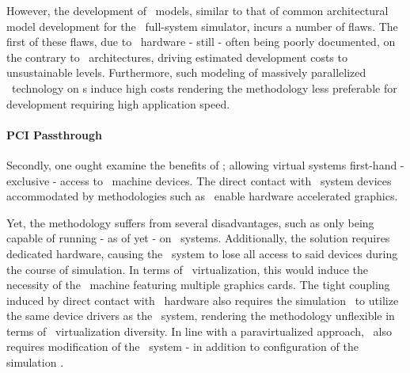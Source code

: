 However, the development of \dvttermgpu\ models, similar to that of common architectural model development for the \dvttermsimics\ full-system simulator, incurs a number of flaws.
The first of these flaws, due to \dvttermgpu\ hardware - still - often being poorly documented, on the contrary to \dvttermcpu\ architectures, driving estimated development costs to unsustainable levels.
Furthermore, such modeling of massively parallelized \dvttermgpu\ technology on \dvttermcpu s induce high costs rendering the methodology less preferable for development requiring high application speed.

\paragraph{PCI Passthrough}
\label{par:background_graphicsvirtualization_pcipassthrough}
Secondly, one ought examine the benefits of \dvttermpcipassthrough ; allowing virtual systems first-hand - exclusive - access to \dvttermhost\ machine devices.
The direct contact with \dvttermhost\ system devices accommodated by methodologies such as \dvttermpcipassthrough\ enable hardware accelerated graphics.

Yet, the methodology suffers from several disadvantages, such as only being capable of running - as of yet - on \dvttermlinux\ systems. %
Additionally, the solution requires dedicated hardware, causing the \dvttermhost\ system to lose all access to said devices during the course of simulation.
In terms of \dvttermgpu\ virtualization, this would induce the necessity of the \dvttermhost\ machine featuring multiple graphics cards.
The tight coupling induced by direct contact with \dvttermhost\ hardware also requires the simulation \dvttermtarget\ to utilize the same device drivers as the \dvttermhost\ system, rendering the methodology unflexible in terms of \dvttermgpu\ virtualization diversity.
In line with a paravirtualized approach, \dvttermpcipassthrough\ also requires modification of the \dvttermtarget\ system - in addition to configuration of the simulation \dvttermhost .


